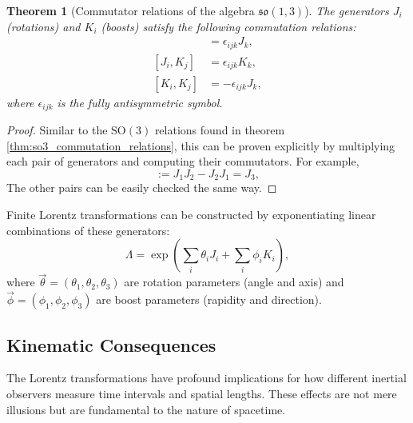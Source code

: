\documentclass{amsart}
\newtheorem{theorem}{Theorem}[section]
\theoremstyle{definition}
\theoremstyle{remark}
\begin{document}
\begin{theorem}[Commutator relations of the algebra $\mathfrak{so}(1,3)$]\label{thm:so13_algebra_commutation_relations}
  The generators $J_i$ (rotations) and $K_i$ (boosts) satisfy the following commutation relations:
  \begin{align*}
    [J_i, J_j] &= \epsilon_{ijk} J_k, \\
    [J_i, K_j] &= \epsilon_{ijk} K_k, \\
    [K_i, K_j] &= -\epsilon_{ijk} J_k,
  \end{align*}
  where $\epsilon_{ijk}$ is the fully antisymmetric symbol.
\end{theorem}
\begin{proof}
    Similar to the $\mathrm{SO}(3)$ relations found in theorem \ref{thm:so3_commutation_relations}, this can be proven explicitly by multiplying each pair of generators and computing their commutators.
  For example,
  \begin{equation*}
    [J_1, J_2] := J_1 J_2 - J_2 J_1 = J_3,
  \end{equation*}
  The other pairs can be easily checked the same way.
\end{proof}

Finite Lorentz transformations can be constructed by exponentiating linear combinations of these generators:
\begin{equation*}
  \Lambda = \exp\left(\sum_i \theta_i J_i + \sum_i \phi_i K_i \right),
\end{equation*}
where $\vec{\theta} = (\theta_1, \theta_2, \theta_3)$ are rotation parameters (angle and axis) and $\vec{\phi} = (\phi_1, \phi_2, \phi_3)$ are boost parameters (rapidity and direction).

\subsection{Kinematic Consequences}
\label{subsec:sr_kinematics}
The Lorentz transformations have profound implications for how different inertial observers measure time intervals and spatial lengths.
These effects are not mere illusions but are fundamental to the nature of spacetime.
\end{document}
